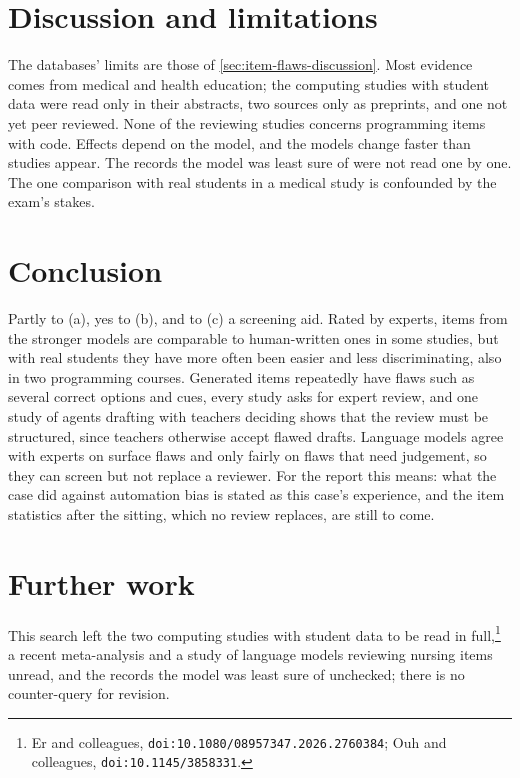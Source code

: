 \section{Discussion and limitations}
\label{sec:llm-items-discussion}

The databases' limits are those of \cref{sec:item-flaws-discussion}.
Most evidence comes from medical and health education; the computing
studies with student data were read only in their abstracts, two sources
only as preprints, and one not yet peer reviewed.  None of the reviewing
studies concerns programming items with code.  Effects depend on the
model, and the models change faster than studies appear.  The records
the model was least sure of were not read one by one.  The one comparison
with real students in a medical study is confounded by the exam's stakes.

\section{Conclusion}
\label{sec:llm-items-conclusion}

Partly to (a), yes to (b), and to (c) a screening aid.  Rated by experts,
items from the stronger models are comparable to human-written ones in
some studies, but with real students they have more often been easier and
less discriminating, also in two programming courses.  Generated items
repeatedly have flaws such as several correct options and cues, every
study asks for expert review, and one study of agents drafting with
teachers deciding shows that the review must be structured, since
teachers otherwise accept flawed drafts.  Language models agree with
experts on surface flaws and only fairly on flaws that need judgement,
so they can screen but not replace a reviewer.  For the report this
means: what the case did against automation bias is stated as this
case's experience, and the item statistics after the sitting, which no
review replaces, are still to come.

\section{Further work}
\label{sec:llm-items-further}

This search left the two computing studies with student data to be read
in full,\footnote{Er and colleagues,
\texttt{doi:10.1080/08957347.2026.2760384}; Ouh and colleagues,
\texttt{doi:10.1145/3858331}.} a recent meta-analysis and a study of
language models reviewing nursing items unread, and the records the model
was least sure of unchecked; there is no counter-query for revision.


